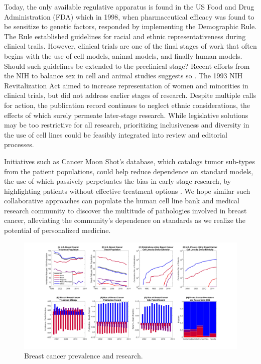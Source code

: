 \documentclass[10pt]{article}
\begin{document}
\begin{multicols}{2}
Today, the only available regulative apparatus is found in the US Food and Drug Administration (FDA) which in 1998, when pharmaceutical efficacy was found to be sensitize to genetic factors, responded by implementing the Demographic Rule. The Rule established guidelines for racial and ethnic representativeness during clinical trails. However, clinical trials are one of the final stages of work that often begins with the use of cell models, animal models, and finally human models. Should such guidelines be extended to the preclinical stage? Recent efforts from the NIH to balance sex in cell and animal studies suggests so \cite{clayton2014nih}. The 1993 NIH Revitalization Act aimed to increase representation of women and minorities in clinical trials, but did not address earlier stages of research. Despite multiple calls for action, the publication record continues to neglect ethnic considerations, the effects of which surely permeate later-stage research. While legislative solutions may be too restrictive for all research, prioritizing inclusiveness and diversity in the use of cell lines could be feasibly integrated into review and editorial processes.

Initiatives such as Cancer Moon Shot's database, which catalogs tumor sub-types from the patient populations, could help reduce dependence on standard models, the use of which passively perpetuates the bias in early-stage research, by highlighting patients without effective treatment options \cite{lowy2016cancer}. We hope similar such collaborative approaches can populate the human cell line bank and medical research community to discover the multitude of pathologies involved in breast cancer, alleviating the community's dependence on standards as we realize the potential of personalized medicine.
 
\end{multicols}

\begin{figure}[h!]
\centering
\includegraphics[width=1\columnwidth, trim = {30cm 10cm 30cm 5cm}, clip]{Figures/BreastComposite.jpg}
\caption{\label{PS1} Breast cancer prevalence and research.}
\end{figure}
 
\end{document}
